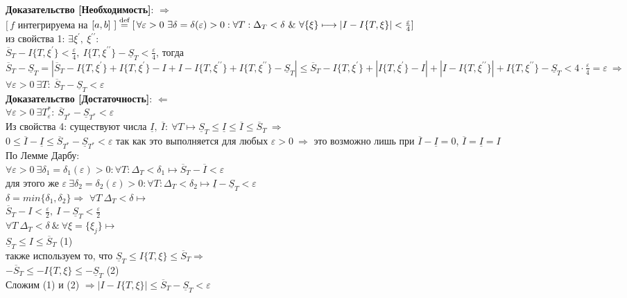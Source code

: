 \documentclass[a4paper,12pt]{article} %
\renewcommand {\leq}{\leqslant}
\begin{document}
\textbf{Доказательство [Необходимость]}: $\Rightarrow$\\
$[\,f$ интегрируема на $[a,b]~] \stackrel{\text{def}}{=}[\,\forall\varepsilon>0~\exists\delta=\delta(\varepsilon)>0: \forall T:\\\Delta_{T}<\delta~\&~ \forall\{\xi\} \longmapsto|I-I\{T, \xi\}|<\frac{\varepsilon}{4}]\,$\\
из свойства 1: $\exists \xi^{\prime},~\xi^{\prime\prime}$:\\
$ \overline{S}_T - I\{T,\xi^{\prime}\}<\frac{\varepsilon}{4},~I\{T,\xi^{\prime\prime}\}-\underline{S}_T<\frac{\varepsilon}{4}$, тогда\\
$\overline{S}_T-\underline{S}_T=|\overline{S}_T-I\{T,\xi^{\prime}\}+I\{T,\xi^{\prime}\}-I+I-I\{T,\xi^{\prime\prime}\}+I\{T,\xi^{\prime\prime}\}-\underline{S}_T|\leq \overline{S}_T-I\{T,\xi^{\prime}\}+|I\{T,\xi^{\prime}\}-I|+|I-I\{T,\xi^{\prime\prime}\}|+I\{T,\xi^{\prime\prime}\}-\underline{S}_T<4\cdot \frac{\varepsilon}{4}=\varepsilon~\Rightarrow$\\
$\forall\varepsilon>0~\exists T:~\overline{S}_T-\underline{S}_T<\varepsilon$\\

\textbf{Доказательство [Достаточность]}: $\Leftarrow$\\
$\forall\varepsilon>0~\exists T^{*}_{\varepsilon}:~\overline{S}_{T^{*}}-\underline{S}_{T^{*}}<\varepsilon$\\
Из свойства 4: существуют числа $\underline{I},~\overline{I}:~\forall T\longmapsto \underline{S}_{T}\leq \underline{I}\leq \overline{I}\leq \overline{S}_{T}~\Rightarrow$\\
$0\leq \overline{I}-\underline{I}\leq \overline{S}_{T^{*}}-\underline{S}_{T^{*}}<\varepsilon$ так как это выполняется для любых $\varepsilon>0~\Rightarrow$ это возможно лишь при $\overline{I}-\underline{I}=0$, $\overline{I}=\underline{I}=I$\\
По Лемме Дарбу:\\
$\forall\varepsilon>0~\exists\delta_1 = \delta_{1}(\varepsilon)>0: \forall T:\Delta_{T}<\delta_1 \longmapsto \overline{S}_T-\overline{I}<\varepsilon$\\
для этого же $\varepsilon~\exists\delta_2 = \delta_{2}(\varepsilon)>0: \forall T:\Delta_{T}<\delta_2 \longmapsto \underline{I}-\underline{S}_T<\varepsilon$\\
$\delta=min\{\delta_1,\delta_2\}\Rightarrow$
$\forall T~\Delta_T<\delta \longmapsto$\\
$\overline{S}_T-I<\frac{\varepsilon}{2},~I-\underline{S}_T<\frac{\varepsilon}{2}$\\
$\forall T~\Delta_T<\delta~\&~\forall \xi=\{\xi_j\}\longmapsto$\\
$\underline{S}_T\leq I\leq \overline{S}_T$ (1)\\
также используем то, что $\underline{S}_T\leq I\{T,\xi\}\leq \overline{S}_T\Rightarrow$\\
$-\overline{S}_T\leq -I\{T,\xi\}\leq -\underline{S}_T$ (2)\\
Сложим (1) и (2) $\Rightarrow |I-I\{T,\xi\}|\leq \overline{S}_T-\underline{S}_T<\varepsilon$\\
\end{document}
